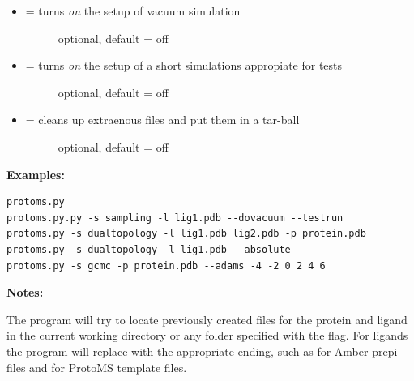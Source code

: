 \documentclass[letterpaper,10pt,english]{manual}
\begin{document}
\begin{itemize}
\begin{description}
\end{description}

\item {} \begin{description}
\item[{ = turns \emph{on} the setup of vacuum simulation}] \leavevmode
optional, default = off

\end{description}

\item {} \begin{description}
\item[{ = turns \emph{on} the setup of a short simulations appropiate for tests}] \leavevmode
optional, default = off

\end{description}

\item {} \begin{description}
\item[{ = cleans up extraenous files and put them in a tar-ball}] \leavevmode
optional, default = off

\end{description}

\end{itemize}

\textbf{Examples:}

\begin{Verbatim}[commandchars=@\[\]]
protoms.py
protoms.py.py -s sampling -l lig1.pdb --dovacuum --testrun
protoms.py -s dualtopology -l lig1.pdb lig2.pdb -p protein.pdb
protoms.py -s dualtopology -l lig1.pdb --absolute
protoms.py -s gcmc -p protein.pdb --adams -4 -2 0 2 4 6
\end{Verbatim}

\textbf{Notes:}

The program will try to locate previously created files for the protein and ligand in the current working directory or any folder specified with the  flag. For ligands the program will replace  with the appropriate ending, such as  for Amber prepi files and  for ProtoMS template files.
\end{document}
